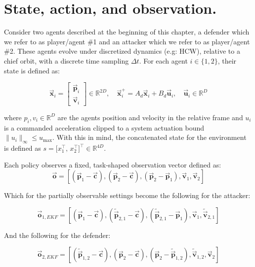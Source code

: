 \section{State, action, and observation.}


Consider two agents described at the beginning of this chapter, a defender which we refer to as player/agent \#1 and an attacker which we refer to as player/agent \#2. These agents evolve under discretized dynamics (e.g: HCW), relative to a chief orbit, with a discrete time sampling \(\Delta t\).
For each agent \(i\in\{1,2\}\), their state is defined as:


\[
\vec{\mathbf{x}}_i =
\begin{bmatrix}
\vec{\mathbf{p}}_i\\
\vec{\mathbf{v}}_i
\end{bmatrix}\in\mathbb{R}^{2D},\quad
\vec{\mathbf{x}}_i^+ = A_d\vec{\mathbf{x}}_i + B_d\vec{\mathbf{u}}_i,\quad\vec{\mathbf{u}}_i\in\mathbb{R}^{D}
\]

where \(p_i,v_i\in\mathbb{R}^{D}\) are the agents position and velocity in the relative frame and \(u_i\) is a commanded acceleration clipped to a system actuation bound \(\|u_i\|_\infty\le u_{\max}\).
With this in mind, the concatenated state for the environment is defined as \(s=\big[x_1^\top,\,x_2^\top\big]^\top\in\mathbb{R}^{4D}\).

Each policy observes a fixed, task-shaped observation vector defined as:
\begin{equation}
\label{eq:Full_Obs_Both_Agents}
\boxed{
\vec{\mathbf{o}} = [(\vec{\mathbf{p}}_1-\vec{\mathbf{c}}),(\vec{\mathbf{p}}_2-\vec{\mathbf{c}}), (\vec{\mathbf{p}}_2-\vec{\mathbf{p}}_1), \vec{\mathbf{v}}_1, \vec{\mathbf{v}}_2]
}
\end{equation}


Which for the partially observable settings become the following for the attacker:

\begin{equation}
\label{eq:EKF_Obs_Agent_1}
\boxed{
\vec{\mathbf{o}}_{1,EKF} = [(\vec{\mathbf{p}}_1-\vec{\mathbf{c}}), (\tilde{\vec{\mathbf{p}}}_{2,1}-\vec{\mathbf{c}}), (\tilde{\vec{\mathbf{p}}}_{2,1}-\vec{\mathbf{p}}_1), \vec{\mathbf{v}}_1, \tilde{\vec{\mathbf{v}}}_{2,1}]
} 
\end{equation}


And the following for the defender:

\begin{equation}
\label{eq:EKF_Obs_Agent_2}
\boxed{
\vec{\mathbf{o}}_{2,EKF} = [(\tilde{\vec{\mathbf{p}}}_{1,2}-\vec{\mathbf{c}}), (\vec{\mathbf{p}}_2-\vec{\mathbf{c}}), (\vec{\mathbf{p}}_2-\tilde{\vec{\mathbf{p}}}_{1,2}), \tilde{\vec{\mathbf{v}}}_{1,2}, \vec{\mathbf{v}}_2]
}
\end{equation}

